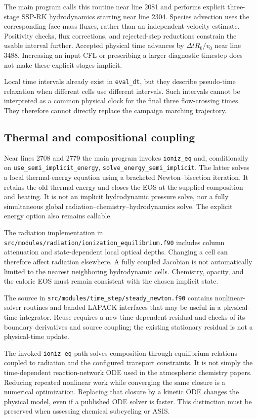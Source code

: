 \documentclass[english,a4paper]{my_memo}
\newcommand{\code}[1]{\nolinkurl{#1}}
\begin{document}
The main program calls this routine near line 2081 and performs explicit three-stage SSP-RK hydrodynamics starting near line 2304. Species advection uses the corresponding face mass fluxes, rather than an independent velocity estimate. Positivity checks, flux corrections, and rejected-step reductions constrain the usable interval further. Accepted physical time advances by $\Delta t R_0/v_0$ near line 3488. Increasing an input CFL or prescribing a larger diagnostic timestep does not make these explicit stages implicit.

Local time intervals already exist in \code{eval_dt}, but they describe pseudo-time relaxation when different cells use different intervals. Such intervals cannot be interpreted as a common physical clock for the final three flow-crossing times. They therefore cannot directly replace the campaign marching trajectory.

\subsection{Thermal and compositional coupling}
Near lines 2708 and 2779 the main program invokes \code{ioniz_eq} and, conditionally on \code{use_semi_implicit_energy}, \code{solve_energy_semi_implicit}. The latter solves a local thermal-energy equation using a bracketed Newton--bisection iteration. It retains the old thermal energy and closes the EOS at the supplied composition and heating. It is not an implicit hydrodynamic pressure solve, nor a fully simultaneous global radiation--chemistry--hydrodynamics solve. The explicit energy option also remains callable.

The radiation implementation in
\code{src/modules/radiation/ionization_equilibrium.f90} includes column attenuation and state-dependent local optical depths. Changing a cell can therefore affect radiation elsewhere. A fully coupled Jacobian is not automatically limited to the nearest neighboring hydrodynamic cells. Chemistry, opacity, and the caloric EOS must remain consistent with the chosen implicit state.

The source in \code{src/modules/time_step/steady_newton.f90} contains nonlinear-solver routines and banded LAPACK interfaces that may be useful in a physical-time integrator. Reuse requires a new time-dependent residual and checks of its boundary derivatives and source coupling; the existing stationary residual is not a physical-time update.

The invoked \code{ioniz_eq} path solves composition through equilibrium relations coupled to radiation and the configured transport constraints. It is not simply the time-dependent reaction-network ODE used in the atmospheric chemistry papers. Reducing repeated nonlinear work while converging the same closure is a numerical optimization. Replacing that closure by a kinetic ODE changes the physical model, even if a published ODE solver is faster. This distinction must be preserved when assessing chemical subcycling or ASIS.
\end{document}
